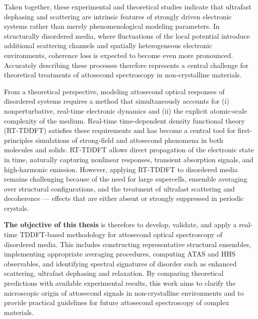 Taken together, these experimental and theoretical studies indicate that ultrafast dephasing and scattering are intrinsic features of strongly driven electronic systems rather than merely phenomenological modeling parameters. In structurally disordered media, where fluctuations of the local potential introduce additional scattering channels and spatially heterogeneous electronic environments, coherence loss is expected to become even more pronounced. Accurately describing these processes therefore represents a central challenge for theoretical treatments of attosecond spectroscopy in non-crystalline materials.








From a theoretical perspective, modeling attosecond optical responses of disordered systems requires a method that simultaneously accounts for (i) nonperturbative, real-time electronic dynamics and (ii) the explicit atomic-scale complexity of the medium. Real-time time-dependent density functional theory (RT-TDDFT) satisfies these requirements and has become a central tool for first-principles simulations of strong-field and attosecond phenomena in both molecules and solids. RT-TDDFT allows direct propagation of the electronic state in time, naturally capturing nonlinear responses, transient absorption signals, and high-harmonic emission. However, applying RT-TDDFT to disordered media remains challenging because of the need for large supercells, ensemble averaging over structural configurations, and the treatment of ultrafast scattering and decoherence — effects that are either absent or strongly suppressed in periodic crystals.


\textbf{The objective of this thesis} is therefore to develop, validate, and apply a real-time TDDFT-based methodology for attosecond optical spectroscopy of disordered media. This includes constructing representative structural ensembles, implementing appropriate averaging procedures, computing ATAS and HHS observables, and identifying spectral signatures of disorder such as enhanced scattering,
ultrafast dephasing and relaxation. By comparing theoretical predictions with available experimental results, this work aims to clarify the microscopic origin of attosecond signals in non-crystalline environments and to provide practical guidelines for future attosecond spectroscopy of complex materials.





